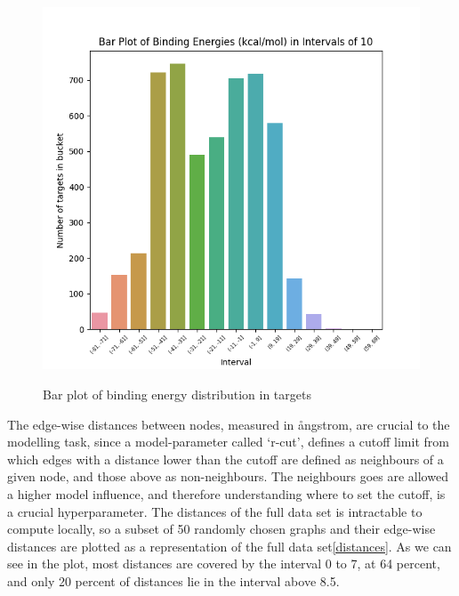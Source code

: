 \begin{figure}[H]
\caption{Bar plot of binding energy distribution in targets}
\centering\label{binding_energies}
\includegraphics[width=\textwidth]{Images/Data/binding_energies.png}
\end{figure}

The edge-wise distances between nodes, measured in ångstrom, are crucial to the modelling task, since a model-parameter called `r-cut', 
defines a cutoff limit from which edges with a distance lower than the cutoff are defined as neighbours of a given node, and those above 
as non-neighbours. The neighbours goes are allowed a higher model influence, and therefore understanding where to set the cutoff, 
is a crucial hyperparameter. The distances of the full data set is intractable to compute locally, so a subset of 50 randomly chosen 
graphs and their edge-wise distances are plotted as a representation of the full data set\ref{distances}. As we can see in the plot, 
most distances are covered by the interval 0 to 7, at 64 percent, and only 20 percent of distances lie in the interval above 8.5. \\

